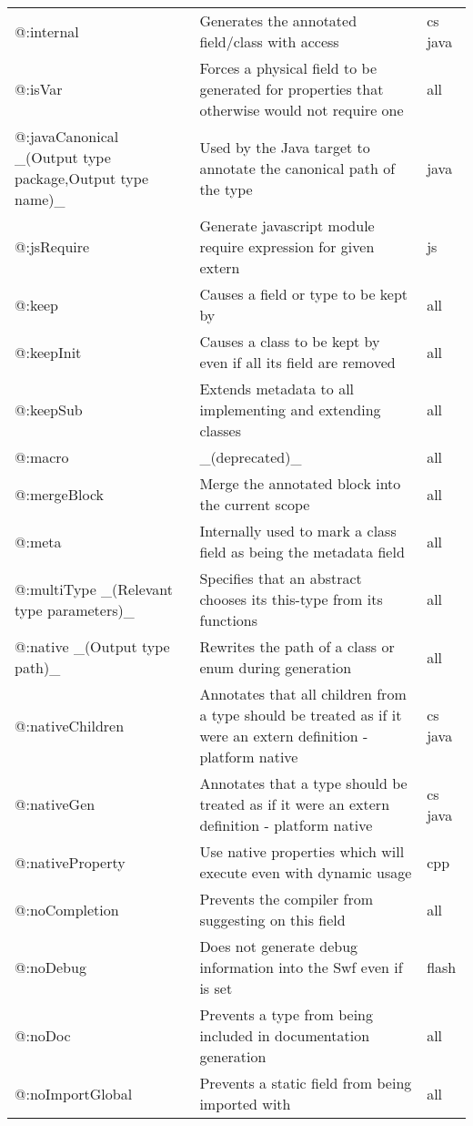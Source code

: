 \begin{center}
\begin{tabular}{| l | l | l |}
	@:internal  &  Generates the annotated field/class with \expr{internal} access  &  cs  java \\
	@:isVar  &  Forces a physical field to be generated for properties that otherwise would not require one  &  all \\
	@:javaCanonical \_(Output type package,Output type name)\_ &  Used by the Java target to annotate the canonical path of the type  &  java \\
	@:jsRequire  &  Generate javascript module require expression for given extern  &  js \\
	@:keep   &  Causes a field or type to be kept by \tref{DCE}{cr-dce}  &  all \\
	@:keepInit  &  Causes a class to be kept by \tref{DCE}{cr-dce} even if all its field are removed  &  all \\
	@:keepSub &  Extends \expr{@:keep} metadata to all implementing and extending classes  &  all \\
	@:macro  &  \_(deprecated)\_  &  all \\
	@:mergeBlock  &  Merge the annotated block into the current scope  &  all \\
	@:meta   &  Internally used to mark a class field as being the metadata field  &  all \\
	@:multiType \_(Relevant type parameters)\_  &  Specifies that an abstract chooses its this-type from its \expr{@:to} functions  &  all \\
	@:native \_(Output type path)\_  &  Rewrites the path of a class or enum during generation  &  all \\
	@:nativeChildren  &  Annotates that all children from a type should be treated as if it were an extern definition - platform native  &  cs java \\
	@:nativeGen  &  Annotates that a type should be treated as if it were an extern definition - platform native  &  cs  java \\
	@:nativeProperty  &  Use native properties which will execute even with dynamic usage  &  cpp \\
	@:noCompletion  &  Prevents the compiler from suggesting \tref{completion}{cr-completion} on this field  &  all \\
	@:noDebug &  Does not generate debug information into the Swf even if \expr{-debug} is set   &  flash \\
	@:noDoc  &  Prevents a type from being included in documentation generation  &  all \\
	@:noImportGlobal  &  Prevents a static field from being imported with \expr{import Class.*}  &  all \\

\end{tabular}
\end{center}
